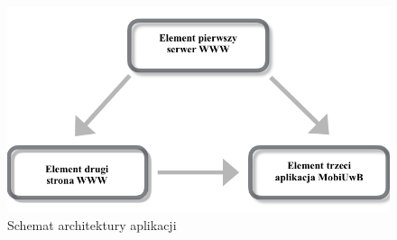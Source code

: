 \documentclass{iiuwb}
\begin{document}
\begin{figure}[!th]
\centering
\includegraphics[scale=.5]{image/architektura.png}
\caption{Schemat architektury aplikacji}
\label{fig:architektura}
\end{figure}
%
%

\cleardoublepage


\end{document}
